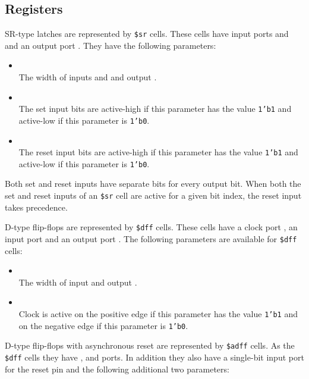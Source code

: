 \subsection{Registers}

SR-type latches are represented by {\tt \$sr} cells.  These cells have input ports
 and  and an output port .  They have the following parameters:

\begin{itemize}
\item {} \\
The width of inputs  and  and output .

\item {} \\
The set input bits are active-high if this parameter has the value {\tt 1'b1} and active-low
if this parameter is {\tt 1'b0}.

\item {} \\
The reset input bits are active-high if this parameter has the value {\tt 1'b1} and active-low
if this parameter is {\tt 1'b0}.
\end{itemize}

Both set and reset inputs have separate bits for every output bit.
When both the set and reset inputs of an {\tt \$sr} cell are active for a given bit
index, the reset input takes precedence.

D-type flip-flops are represented by {\tt \$dff} cells. These cells have a clock port ,
an input port  and an output port . The following parameters are available for {\tt \$dff}
cells:

\begin{itemize}
\item {} \\
The width of input  and output .

\item {} \\
Clock is active on the positive edge if this parameter has the value {\tt 1'b1} and on the negative
edge if this parameter is {\tt 1'b0}.
\end{itemize}

D-type flip-flops with asynchronous reset are represented by {\tt \$adff} cells. As the {\tt \$dff}
cells they have ,  and  ports. In addition they also have a single-bit 
input port for the reset pin and the following additional two parameters:

